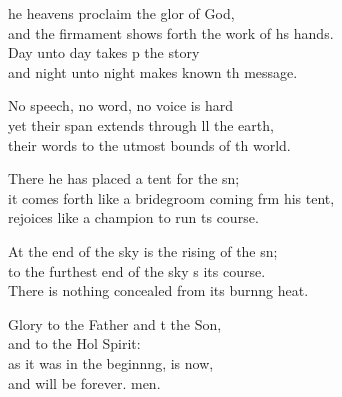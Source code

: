 \begin{psalmverse}
  \begin{patverse}
he heavens proclaim the glor of God,\Med\\
and the firmament shows forth the work of h\pointup{\i}s hands.\\
Day unto day takes p the story\Med\\
and night unto night makes known th message.

No speech, no word, no voice is hard\Flex\\
yet their span extends through ll the earth,\Med\\
their words to the utmost bounds of th world.

There he has placed a tent for the sn;\Flex\\
it comes forth like a bridegroom coming frm his tent,\Med\\
rejoices like a champion to run \pointup{\i}ts course.

At the end of the sky is the rising of the sn;\Flex\\
to the furthest end of the sky \pointup{\i}s its course.\Med\\
There is nothing concealed from its burn\pointup{\i}ng heat.

Glory to the Father and t the Son,\Med\\
and to the Hol Spirit:\\
as it was in the beginn\pointup{\i}ng, is now,\Med\\
and will be forever. men. 
  \end{patverse}
\end{psalmverse}
